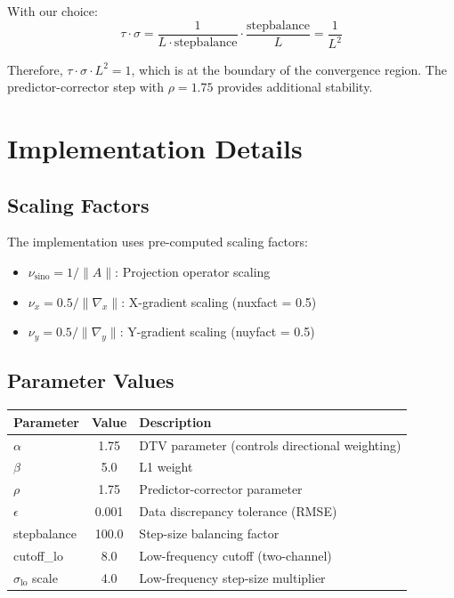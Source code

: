 \documentclass[11pt]{article}
\begin{document}
With our choice:
\begin{equation}
\tau \cdot \sigma = \frac{1}{L \cdot \text{stepbalance}} \cdot \frac{\text{stepbalance}}{L} = \frac{1}{L^2}
\end{equation}

Therefore, $\tau \cdot \sigma \cdot L^2 = 1$, which is at the boundary of the convergence region. The predictor-corrector step with $\rho = 1.75$ provides additional stability.

\section{Implementation Details}

\subsection{Scaling Factors}

The implementation uses pre-computed scaling factors:
\begin{itemize}
    \item $\nu_{\text{sino}} = 1/\|A\|$: Projection operator scaling
    \item $\nu_x = 0.5/\|\nabla_x\|$: X-gradient scaling (nuxfact = 0.5)
    \item $\nu_y = 0.5/\|\nabla_y\|$: Y-gradient scaling (nuyfact = 0.5)
\end{itemize}

\subsection{Parameter Values}

\begin{table}[h]
\centering
\begin{tabular}{|l|c|l|}
\hline
\textbf{Parameter} & \textbf{Value} & \textbf{Description} \\
\hline
$\alpha$ & 1.75 & DTV parameter (controls directional weighting) \\
$\beta$ & 5.0 & L1 weight \\
$\rho$ & 1.75 & Predictor-corrector parameter \\
$\epsilon$ & 0.001 & Data discrepancy tolerance (RMSE) \\
stepbalance & 100.0 & Step-size balancing factor \\
cutoff\_lo & 8.0 & Low-frequency cutoff (two-channel) \\
$\sigma_{\text{lo}}$ scale & 4.0 & Low-frequency step-size multiplier \\
\hline
\end{tabular}
\end{table}
\end{document}
